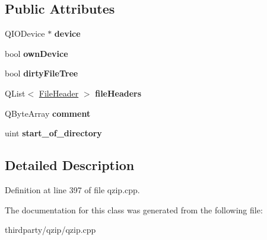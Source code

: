 \subsection*{Public Attributes}
\begin{DoxyCompactItemize}
\item 
\mbox{\label{class_m_q_zip_private_a5348e4a9641f35c053f242b3869a111b}} 
Q\+I\+O\+Device $\ast$ {\bfseries device}
\item 
\mbox{\label{class_m_q_zip_private_a64fb3c52c2e03787b87667e218349aef}} 
bool {\bfseries own\+Device}
\item 
\mbox{\label{class_m_q_zip_private_ac3278ee5f38b88f1b0701c6b06ab38f5}} 
bool {\bfseries dirty\+File\+Tree}
\item 
\mbox{\label{class_m_q_zip_private_ad560b80505164c55dd813e5fd687c928}} 
Q\+List$<$ \hyperlink{struct_file_header}{File\+Header} $>$ {\bfseries file\+Headers}
\item 
\mbox{\label{class_m_q_zip_private_aa234d304db1c51a8810379f1d3443932}} 
Q\+Byte\+Array {\bfseries comment}
\item 
\mbox{\label{class_m_q_zip_private_a9b25e8a27a2637b6aaa6cc9aaaa81cc5}} 
uint {\bfseries start\+\_\+of\+\_\+directory}
\end{DoxyCompactItemize}


\subsection{Detailed Description}


Definition at line 397 of file qzip.\+cpp.



The documentation for this class was generated from the following file\+:\begin{DoxyCompactItemize}
\item 
thirdparty/qzip/qzip.\+cpp\end{DoxyCompactItemize}
